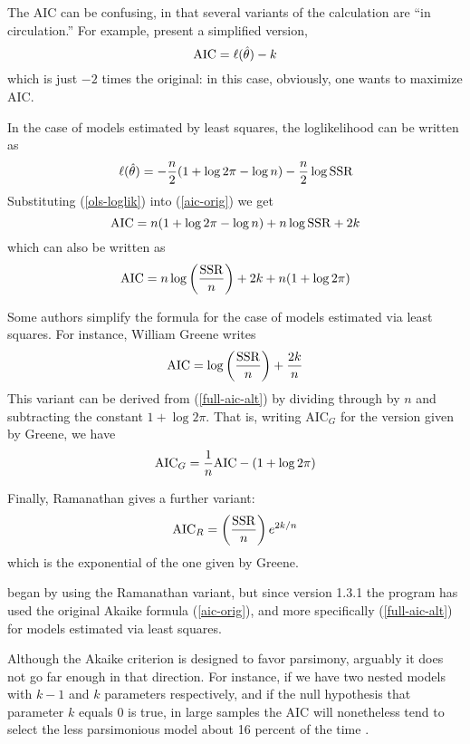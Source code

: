 The AIC can be confusing, in that several variants of the calculation
are ``in circulation.''  For example, \cite{davidson-mackinnon04}
present a simplified version,
%
\[
{\rm AIC} = \ell(\hat{\theta}) - k
\]
%
which is just $-2$ times the original: in this case, obviously, one
wants to maximize AIC.

In the case of models estimated by least squares, the loglikelihood
can be written as
%
\begin{equation}
\label{ols-loglik}
\ell(\hat{\theta}) = -\frac{n}{2}(1 + \log 2\pi - \log n)
 - \frac{n}{2} \log {\rm SSR}
\end{equation}
%
Substituting (\ref{ols-loglik}) into (\ref{aic-orig}) we get
%
\[
{\rm AIC} = n(1 + \log 2\pi - \log n) + n\log {\rm SSR} + 2k
\]
%
which can also be written as
%
\begin{equation}
\label{full-aic-alt}
{\rm AIC} = n\log \left( \frac{\rm SSR}{n} \right) + 2k + 
  n(1 + \log 2\pi)
\end{equation}
%

Some authors simplify the formula for the case of models estimated
via least squares.  For instance, William Greene writes
%
\begin{equation}
\label{aic-greene}
{\rm AIC} = \log \left( \frac{\rm SSR}{n} \right) + \frac{2k}{n}
\end{equation}
%
This variant can be derived from (\ref{full-aic-alt}) by dividing
through by $n$ and subtracting the constant $1 + \log 2\pi$.  That is,
writing AIC$_G$ for the version given by Greene, we have
%
\[
{\rm AIC}_G = \frac{1}{n} {\rm AIC} - (1 + \log 2\pi)
\]
%

Finally, Ramanathan gives a further variant:
%
\[
{\rm AIC}_R = \left( \frac{\rm SSR}{n} \right) e^{2k/n}
\]
%
which is the exponential of the one given by Greene.  

 began by using the Ramanathan variant, but since version 1.3.1
the program has used the original Akaike formula (\ref{aic-orig}), and
more specifically (\ref{full-aic-alt}) for models estimated via least
squares.

\vspace{1ex}

Although the Akaike criterion is designed to favor parsimony, arguably
it does not go far enough in that direction.  For instance, if we have
two nested models with $k-1$ and $k$ parameters respectively, and if
the null hypothesis that parameter $k$ equals 0 is true, in large
samples the AIC will nonetheless tend to select the less parsimonious
model about 16 percent of the time \citep[see][chapter
15]{davidson-mackinnon04}.

